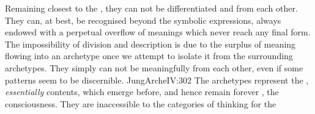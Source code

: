 \pa Remaining closest to the , they can not be differentiated and
 from each other.  They can, at best, be recognised
beyond the symbolic expressions, always endowed with a perpetual overflow of
meanings which never reach any final form. The impossibility of 
division and description is due to the surplus of meaning flowing into an
archetype once we attempt to isolate it from the surrounding archetypes.  They
simply can not be meaningfully  from each other, even if some
patterns seem to be discernible.  \citet{It is a well-nigh hopeless undertaking
  to tear a single archetype out of the living tissue of the psyche; but despite
  their interwovenness they do form units of meaning that can be apprehended
  intuitively.}{JungArche}{IV:302} The archetypes represent the ,
{\em essentially}  contents, which emerge before, and hence
remain forever , the  consciousness. They are inaccessible
to the  categories of  thinking for the
